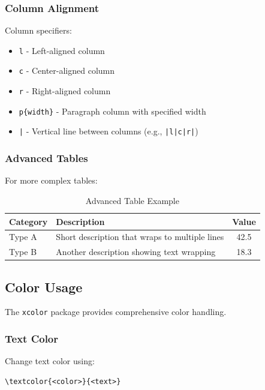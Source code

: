 \subsubsection{Column Alignment}\label{subsubsec:column-alignment}
Column specifiers:
\begin{itemize}
    \item \texttt{l} - Left-aligned column
    \item \texttt{c} - Center-aligned column
    \item \texttt{r} - Right-aligned column
    \item \texttt{p\{width\}} - Paragraph column with specified width
    \item \texttt{|} - Vertical line between columns (e.g., \texttt{|l|c|r|})
\end{itemize}

\subsubsection{Advanced Tables}\label{subsubsec:advanced-tables}
For more complex tables:

\begin{table}[htbp]
    \caption{Advanced Table Example}
    \centering
    \begin{tabular}{@{}l>{\raggedright\arraybackslash}p{3cm}c@{}}
        \toprule
        \textbf{Category} & \textbf{Description} & \textbf{Value} \\
        \midrule
        Type A & Short description that wraps to multiple lines & 42.5 \\
        \midrule
        Type B & Another description showing text wrapping & 18.3 \\
        \bottomrule
    \end{tabular}
    \label{tab:advanced-example}
\end{table}

\subsection{Color Usage}\label{subsec:color-usage}
The \texttt{xcolor} package provides comprehensive color handling.

\subsubsection{Text Color}\label{subsubsec:text-color}
Change text color using:
\begin{verbatim}
\textcolor{<color>}{<text>}
\end{verbatim}

